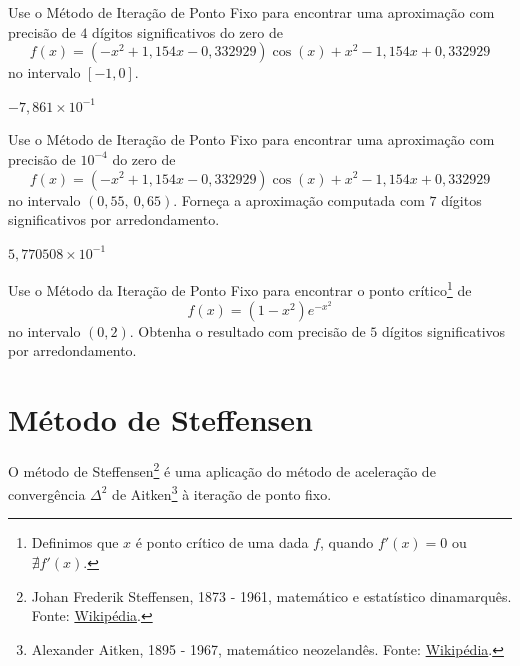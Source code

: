 \begin{exer}
  Use o Método de Iteração de Ponto Fixo para encontrar uma aproximação com precisão de $4$ dígitos significativos do zero de 
  \begin{equation}
    f(x) = (-x^2+1,154x-0,332929)\cos(x) + x^2 - 1,154x + 0,332929
  \end{equation}
  no intervalo $[-1, 0]$.
\end{exer}
\begin{resp}
  $-7,861\times 10^{-1}$
\end{resp}

\begin{exer}
  Use o Método de Iteração de Ponto Fixo para encontrar uma aproximação com precisão de $10^{-4}$ do zero de
  \begin{equation}
    f(x) = (-x^2+1,154x-0,332929)\cos(x) + x^2 - 1,154x + 0,332929
  \end{equation}
no intervalo $(0,55, ~0,65)$. Forneça a aproximação computada com $7$ dígitos significativos por arredondamento.
\end{exer}
\begin{resp}
  $5,770508\times 10^{-1}$
\end{resp}

\begin{exer}
  Use o Método da Iteração de Ponto Fixo para encontrar o ponto crítico\footnote{Definimos que $x$ é ponto crítico de uma dada $f$, quando $f'(x) = 0$ ou $\nexists f'(x)$.} de
  \begin{equation}
    f(x) = (1-x^2)e^{-x^2}
  \end{equation}
  no intervalo $(0, 2)$. Obtenha o resultado com precisão de $5$ dígitos significativos por arredondamento.
\end{exer}

\section{Método de Steffensen}\label{cap_eq1d_sec_Steffensen}

O método de Steffensen\footnote{Johan Frederik Steffensen, 1873 - 1961, matemático e estatístico dinamarquês. Fonte: \href{https://pt.wikipedia.org/wiki/Johan_Frederik_Steffensen}{Wikipédia}.} é uma aplicação do método de aceleração de convergência $\Delta^2$ de Aitken\footnote{Alexander Aitken, 1895 - 1967, matemático neozelandês. Fonte: \href{https://pt.wikipedia.org/wiki/Alexander_Aitken}{Wikipédia}.} à iteração de ponto fixo.

